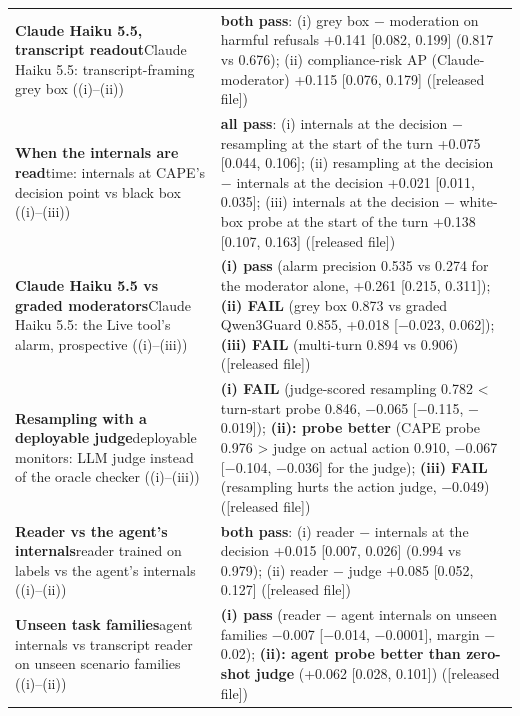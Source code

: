 {\begin{longtable}{p{}p{}}
\textbf{Claude Haiku 5.5, transcript readout}\newline Claude Haiku 5.5: transcript-framing grey box ((i)--(ii)) & \textbf{both pass}: (i) grey box $-$ moderation on harmful refusals +0.141 [0.082, 0.199] (0.817 vs 0.676); (ii) compliance-risk AP (Claude-moderator) +0.115 [0.076, 0.179] ([released file])\\[2pt]
\textbf{When the internals are read}\newline time: internals at CAPE's decision point vs black box ((i)--(iii)) & \textbf{all pass}: (i) internals at the decision $-$ resampling at the start of the turn +0.075 [0.044, 0.106]; (ii) resampling at the decision $-$ internals at the decision +0.021 [0.011, 0.035]; (iii) internals at the decision $-$ white-box probe at the start of the turn +0.138 [0.107, 0.163] ([released file])\\[2pt]
\textbf{Claude Haiku 5.5 vs graded moderators}\newline Claude Haiku 5.5: the Live tool's alarm, prospective ((i)--(iii)) & \textbf{(i) pass} (alarm precision 0.535 vs 0.274 for the moderator alone, +0.261 [0.215, 0.311]); \textbf{(ii) FAIL} (grey box 0.873 vs graded Qwen3Guard 0.855, +0.018 [$-$0.023, 0.062]); \textbf{(iii) FAIL} (multi-turn 0.894 vs 0.906) ([released file])\\[2pt]
\textbf{Resampling with a deployable judge}\newline deployable monitors: LLM judge instead of the oracle checker ((i)--(iii)) & \textbf{(i) FAIL} (judge-scored resampling 0.782 < turn-start probe 0.846, $-$0.065 [$-$0.115, $-$0.019]); \textbf{(ii): probe better} (CAPE probe 0.976 > judge on actual action 0.910, $-$0.067 [$-$0.104, $-$0.036] for the judge); \textbf{(iii) FAIL} (resampling hurts the action judge, $-$0.049) ([released file])\\[2pt]
\textbf{Reader vs the agent's internals}\newline reader trained on labels vs the agent's internals ((i)--(ii)) & \textbf{both pass}: (i) reader $-$ internals at the decision +0.015 [0.007, 0.026] (0.994 vs 0.979); (ii) reader $-$ judge +0.085 [0.052, 0.127] ([released file])\\[2pt]
\textbf{Unseen task families}\newline agent internals vs transcript reader on unseen scenario families ((i)--(ii)) & \textbf{(i) pass} (reader $-$ agent internals on unseen families $-$0.007 [$-$0.014, $-$0.0001], margin $-$0.02); \textbf{(ii): agent probe better than zero-shot judge} (+0.062 [0.028, 0.101]) ([released file])\\[2pt]

\end{longtable}}
